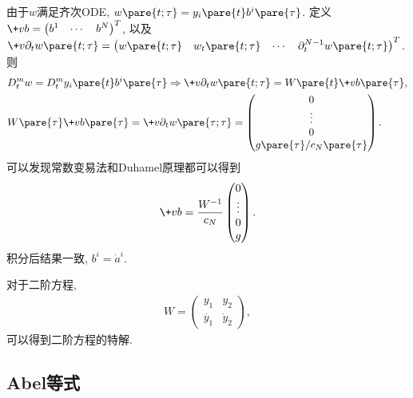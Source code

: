 \documentclass[hidelinks]{ctexart}
\begin{document}
由于$w$满足齐次ODE, $w\pare{t;\tau} = y_i\pare{t}b^i\pare{\tau}$. 定义$\+vb = \begin{pmatrix}
    b^1 & \cdots & b^N
\end{pmatrix}^T$, 以及$\+v{\partial}_t w\pare{t;\tau} = \begin{pmatrix}
    w\pare{t;\tau} & w_t\pare{t;\tau} & \cdots & \partial_t^{N-1}w\pare{t;\tau}
\end{pmatrix}^T$. 则
\begin{align*}
    & D_t^m w = D_t^m y_i\pare{t}b^i\pare{\tau} \Rightarrow \+v{\partial}_t w\pare{t;\tau} = W\pare{t} \+vb\pare{\tau}, \\
    & W\pare{\tau}\+vb\pare{\tau} = \+v\partial_t w\pare{\tau;\tau} = \begin{pmatrix}
        0 \\ \vdots \\ 0 \\ g\pare{\tau}/c_N\pare{\tau}
    \end{pmatrix}. 
\end{align*}
可以发现常数变易法和Duhamel原理都可以得到
\[ \+vb = \frac{W^{-1}}{c_N}\begin{pmatrix}
    0 \\ \vdots \\ 0 \\ g
\end{pmatrix}. \]
积分后结果一致, $b^i = \dot{a}^i$.
\begin{ex}
    对于二阶方程,
    \begin{align*}
        W = \begin{pmatrix}
            y_1 & y_2 \\
            \dot{y_1} & \dot{y}_2
        \end{pmatrix},
    \end{align*}
    可以得到二阶方程的特解.
\end{ex}


\subsection{Abel等式} %
\label{sub:abel等式}
\end{document}
